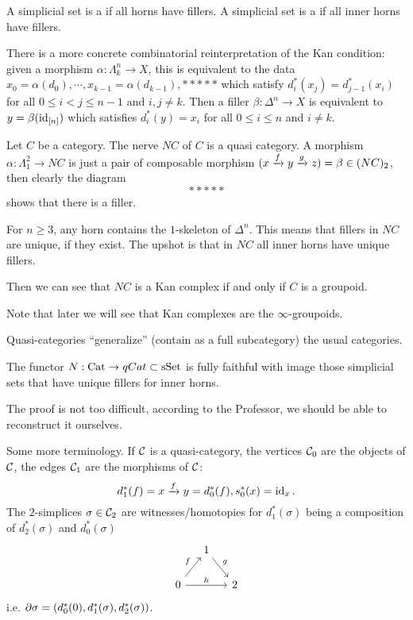 {A simplicial set is a  if all horns have fillers. A simplicial set is a  if all inner horns have fillers.

There is a more concrete combinatorial reinterpretation of the Kan condition: given a morphism $\alpha:\Lambda^n_k\to X$, this is equivalent to the data $x_0=\alpha(d_0),\cdots,x_{k-1}=\alpha(d_{k-1}),*****$ which satisfy $d_i^*(x_j)=d_{j-1}^*(x_i)$ for all $0\le i<j\le n-1$ and $i,j\ne k$. Then a filler $\beta:\Delta^n\to X$ is equivalent to $y=\beta(\operatorname{id}_{[n]})$ which satisfies $d_i^*(y)=x_i$ for all $0\le i\le n$ and $i\ne k$.

\begin{example}
Let $C$ be a category. The nerve $NC$ of $C$ is a quasi category. A morphism $\alpha:\Lambda^2_1\to NC$ is just a pair of composable morphism $(x\xrightarrow{f}y\xrightarrow{g}z)=\beta\in (NC)_2$, then clearly the diagram
\[*****\]
shows that there is a filler.

For $n\ge3$, any horn contains the $1$-skeleton of $\Delta^n$. This means that fillers in $NC$ are unique, if they exist. The upshot is that in $NC$ all inner horns have unique fillers.

Then we can see that $NC$ is a Kan complex if and only if $C$ is a groupoid.

Note that later we will see that Kan complexes are the $\infty$-groupoids.
\end{example}

Quasi-categories \enquote{generalize} (contain as a full subcategory) the usual categories.

\begin{proposition}
The functor $N:{\mathrm{Cat}}\to qCat\subset{\mathrm{sSet}}$ is fully faithful with image those simplicial sets that have unique fillers for inner horns.
\end{proposition}

The proof is not too difficult, according to the Professor, we should be able to reconstruct it ourselves.

Some more terminology. If $\mathcal{C}$ is a quasi-category, the vertices $\mathcal{C}_0$ are the objects of $\mathcal{C}$, the edges $\mathcal{C}_1$ are the morphisms of $\mathcal{C}$:
\[d_1^*(f)=x\xrightarrow{f}y=d_0^*(f), s_0^*(x)=\operatorname{id}_x.\]
The $2$-simplices $\sigma\in\mathcal{C}_2$ are witnesses/homotopies for $d_1^*(\sigma)$ being a composition of $d_2^*(\sigma)$ and $d_0^*(\sigma)$
\[
\begin{tikzcd}[column sep=small]
& 1 \ar[dr,"g"] & \\
0 \ar[ur,"f"] \ar[rr,"h"] & & 2
\end{tikzcd}
\]
i.e. $\partial\sigma=(d_0^*(0),d_1^*(\sigma),d_2^*(\sigma))$.

}
